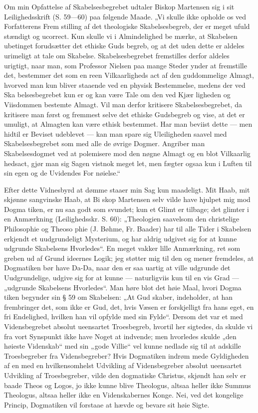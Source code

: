 \documentclass[12pt]{book}
\newcommand{\opage}[1]{\marginnote{\footnotesize\textit{[#1]}}}
\begin{document}
Om min Opfattelse af Skabelsesbegrebet udtaler Biskop
Martensen sig i sit Leilighedsskrift (S. 59---60) paa følgende
Maade. „Vi skulle ikke opholde os ved Forfatterens Frem\-%
stilling af det theologiske Skabelsesbegreb, der er meget ufuld\-%
stændigt og ucorrect. Kun skulle vi i Almindelighed be\-%
mærke, at Skabelsen ubetinget forudsætter det ethiske Guds\-%
begreb, og at det uden dette er aldeles urimeligt at tale om
Skabelse. Skabelsesbegrebet fremstilles derfor aldeles urigtigt,
naar man, som Professor Nielsen paa mange Steder ynder
at fremstille det, bestemmer det som en reen Vilkaarligheds\-%
act af den guddommelige Almagt, hvorved man kun bliver
staaende ved en physisk Bestemmelse, medens der ved Ska\-%
belsesbegrebet kun er og kan være Tale om den ved Kjær\-%
ligheden og Viisdommen bestemte Almagt. Vil man derfor
kritisere Skabelsesbegrebet, da kritisere man først og fremmest
selve det ethiske Gudsbegreb og vise, at det er umuligt, at
Almagten kan være ethisk bestemmet. Har man beviist dette
--- men hidtil er Beviset udeblevet --- kan man spare sig
Uleiligheden saavel med Skabelsesbegrebet som med alle de
øvrige Dogmer. Angriber man Skabelsesdogmet ved at
polemisere mod den nøgne Almagt og en blot Vilkaarlig\-%
hedsact, gjør man sig Sagen vistnok meget let, men fægter
ogsaa kun i Luften til sin egen og de Uvidendes For\-%
nøielse.“

Efter dette Vidnesbyrd at dømme staaer min Sag kun
maadeligt. Mit Haab, mit skjønne sangvinske Haab, at Bi\-%
skop Martensen selv vilde have hjulpet mig mod Dogma\-%
tiken, er nu saa godt som svundet; kun et Glimt er
tilbage; det glimter i en Anmærkning (Leilighedsskr. S. 60):
\opage{97}\setcounter{footnote}{0}%
„Theologien saavelsom den christelige Philosophie og Theoso\-%
phie (J. Bøhme, Fr. Baader) har til alle Tider i Skabelsen
erkjendt et uudgrundeligt Mysterium, og har aldrig udgivet
sig for at kunne udgrunde Skabelsens Hvorledes“. En meget
vakker lille Anmærkning, ret som greben ud af Grund\-%
ideernes Logik; jeg støtter mig til den og mener fremdeles,
at Dogmatiken bør have Da-Da, naar den er saa uartig at
ville udgrunde det Uudgrundelige, udgive sig for at kunne ---
naturligviis kun til en vis Grad --- „udgrunde Skabelsens
Hvorledes“. Man høre blot det høie Maal, hvori Dogma\-%
tiken begynder sin § 59 om Skabelsen: „At Gud skaber,
indeholder, at han frembringer det, som ikke er Gud, det,
hvis Væsen er forskjelligt fra hans eget, en fri Endelighed,
hvilken han vil opfylde med sin Fylde“. Dersom det var et
med Vidensbegrebet absolut ueensartet Troesbegreb, hvortil
her sigtedes, da skulde vi fra vort Synspunkt ikke have Noget
at indvende; men hvorledes skulde „den høieste Videnskab“
med sin „gode Villie“ vel kunne nedlade sig til at adskille
Troesbegreber fra Vidensbegreber? Hvis Dogmatiken indrøm\-%
mede Gyldigheden af en med en hvilkensomhelst Udvikling af
Vidensbegreber absolut ueensartet Udvikling af Troesbegreber,
vilde den dogmatiske Christus, skjøndt han selv er baade
Theos og Logos, jo ikke kunne blive Theologus, altsaa heller
ikke Summus Theologus, altsaa heller ikke en Videnskabernes
Konge. Nei, ved det kongelige Princip, Dogmatiken vil
forstaae at hævde og bevare sit høie Sigte.
\end{document}
